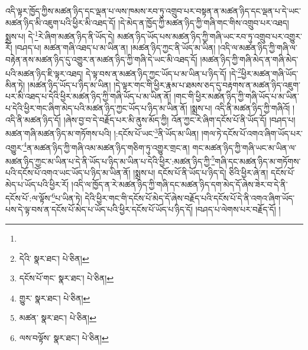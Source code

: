 འདི་ལྟར་ཁྱོད་ཀྱིས་མཚན་ཉིད་དང་ལྡན་པ་ལས་ཁམས་རབ་ཏུ་འགྲུབ་པར་བསྟན་ན་མཚན་ཉིད་དང་ལྡན་པ་དེ་ཡང་མཚན་ཉིད་མི་འཇུག་པའི་ཕྱིར་མི་འཐད་དོ། །དེ་མེད་ན་ཁྱོད་ཀྱི་མཚན་ཉིད་ཀྱི་གཞི་གང་གིས་འགྲུབ་པར་འཐད། སྨྲས་པ། དེ་\footnote{}རེ་ཞིག་མཚན་ཉིད་ནི་ཡོད་དེ། མཚན་ཉིད་ཡོད་པས་མཚན་ཉིད་ཀྱི་གཞི་ཡང་རབ་ཏུ་འགྲུབ་པར་འགྱུར་རོ། །བཤད་པ། མཚན་གཞི་འཐད་པ་མ་ཡིན་ན། །མཚན་ཉིད་ཀྱང་ནི་ཡོད་མ་ཡིན། །འདི་ལ་མཚན་ཉིད་ཀྱི་གཞི་ལ་བརྟེན་ནས་མཚན་ཉིད་དུ་འགྱུར་ན་མཚན་ཉིད་ཀྱི་གཞི་དེ་ཡང་མི་འཐད་དོ། །མཚན་ཉིད་ཀྱི་གཞི་མེད་ན་གཞི་མེད་པའི་མཚན་ཉིད་ཇི་ལྟར་འཐད། དེ་ལྟ་བས་ན་མཚན་ཉིད་ཀྱང་ཡོད་པ་མ་ཡིན་པ་ཉིད་དོ། །དེ་\footnote{དེའི་  སྣར་ཐང་།  པེ་ཅིན། }ཕྱིར་མཚན་གཞི་ཡོད་མིན་ཏེ། །མཚན་ཉིད་ཡོད་པ་ཉིད་མ་ཡིན། །དེ་ལྟར་གང་གི་ཕྱིར་རྣམ་པ་ཐམས་ཅད་དུ་བརྟགས་ན་མཚན་ཉིད་འཇུག་པར་མི་འཐད་པ་དེའི་ཕྱིར་མཚན་ཉིད་ཀྱི་གཞི་ཡོད་པ་མ་ཡིན་ནོ། །གང་གི་ཕྱིར་མཚན་ཉིད་ཀྱི་གཞི་ཡོད་པ་མ་ཡིན་པ་དེའི་ཕྱིར་གང་ཞིག་མེད་པའི་མཚན་ཉིད་ཀྱང་ཡོད་པ་ཉིད་མ་ཡིན་ནོ། །སྨྲས་པ། འདི་ནི་མཚན་ཉིད་ཀྱི་གཞིའོ། །འདི་ནི་མཚན་ཉིད་དོ། །ཞེས་བྱ་བ་དེ་བརྗོད་པར་མི་ནུས་མོད་ཀྱི། འོན་ཀྱང་རེ་ཞིག་དངོས་པོ་ནི་ཡོད་དོ། །བཤད་པ། མཚན་གཞི་མཚན་ཉིད་མ་གཏོགས་པའི། །:དངོས་པོ་ཡང་\footnote{དངོས་པོ་གང་  སྣར་ཐང་།  པེ་ཅིན། }ནི་ཡོད་མ་ཡིན། །གལ་ཏེ་དངོས་པོ་འགའ་ཞིག་ཡོད་པར་འགྱུར་\footnote{གྱུར་  སྣར་ཐང་།  པེ་ཅིན། }ན་མཚན་ཉིད་ཀྱི་གཞི་འམ་མཚན་ཉིད་གཅིག་ཏུ་འགྱུར་གྲང་ན། གང་མཚན་ཉིད་ཀྱི་གཞི་ཡང་མ་ཡིན་ལ་མཚན་ཉིད་ཀྱང་མ་ཡིན་པ་དེ་ནི་ཡོད་པ་ཉིད་མ་ཡིན་པ་དེའི་ཕྱིར་:མཚན་ཉིད་ཀྱི་\footnote{མཚན་  སྣར་ཐང་།  པེ་ཅིན། }གཞི་དང་མཚན་ཉིད་མ་གཏོགས་པའི་དངོས་པོ་འགའ་ཡང་ཡོད་པ་ཉིད་མ་ཡིན་ནོ། །སྨྲས་པ། དངོས་པོ་ནི་ཡོད་པ་ཉིད་དེ། ཅིའི་ཕྱིར་ཞེ་ན། དངོས་པོ་མེད་པ་ཡོད་པའི་ཕྱིར་རོ། །འདི་ལ་ཁྱོད་ན་རེ་མཚན་ཉིད་ཀྱི་གཞི་དང་མཚན་ཉིད་དག་མེད་དོ་ཞེས་ཟེར་བ་དེ་ནི་དངོས་པོ་:ལ་ལྟོས་\footnote{ལས་བལྟོས་  སྣར་ཐང་།  པེ་ཅིན། }པ་ཡིན་ཏེ། དེའི་ཕྱིར་གང་གི་དངོས་པོ་མེད་དོ་ཞེས་བརྗོད་པའི་དངོས་པོ་དེ་ནི་འགའ་ཞིག་ཡོད་པས་དེ་ལྟ་བས་ན་དངོས་པོ་མེད་པ་ཡོད་པའི་ཕྱིར་དངོས་པོ་ཡོད་པ་ཉིད་དོ། །བཤད་པ་ལེགས་པར་བརྗོད་དོ། །
